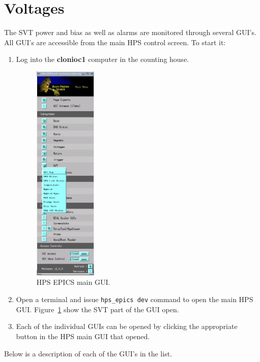 \documentclass[12pt]{report}
\begin{document}
\section{Voltages}
\label{sec:monitoring_power}
The SVT power and bias as well as alarms are monitored through several GUI's. All GUI's are accessible from the main HPS control screen. To start it:

\begin{enumerate}
\item Log into the \textbf{clonioc1} computer in the counting house.

\begin{figure}[ht!]
\centering
\includegraphics[width=3cm]{epics_dev_svt.png}
\caption{HPS EPICS main GUI. \label{fig:hps_epics_svt}}
\end{figure}

\item Open a terminal and issue \texttt{hps\_epics dev} command to open the main HPS GUI. Figure~\ref{fig:hps_epics_svt} show the SVT part of the GUI open.
\item Each of the individual GUIs can be opened by clicking the appropriate button in the HPS main GUI that opened.
\end{enumerate}

Below is a description of each of the GUI's in the list.
\end{document}
